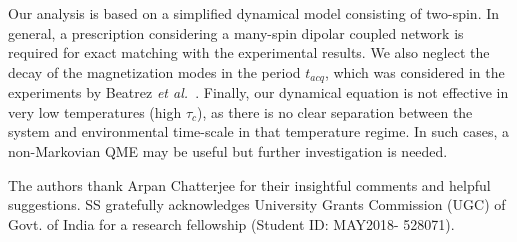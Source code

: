 \documentclass[prl,aps,preprint,floatfix]{revtex4-2}
\newcommand{\etal}{\textit{et al.\ }}
\begin{document}
Our analysis is based on a simplified dynamical model consisting of two-spin. In general, a prescription considering a many-spin dipolar coupled network is required for exact matching with the experimental results. We also neglect the decay of the magnetization modes in the period $t_{acq}$, which was considered in the experiments by Beatrez \etal \cite{beatrez_critical_2023}. Finally, our dynamical equation is not effective in very low temperatures (high $\tau_c$), as there is no clear separation between the system and environmental time-scale in that temperature regime. In such cases, a non-Markovian QME may be useful but further investigation is needed.   











The authors thank Arpan Chatterjee for their insightful comments and helpful
suggestions. SS gratefully acknowledges University Grants Commission (UGC) of Govt. of India for a research fellowship (Student ID: MAY2018- 528071).

 


\end{document}
